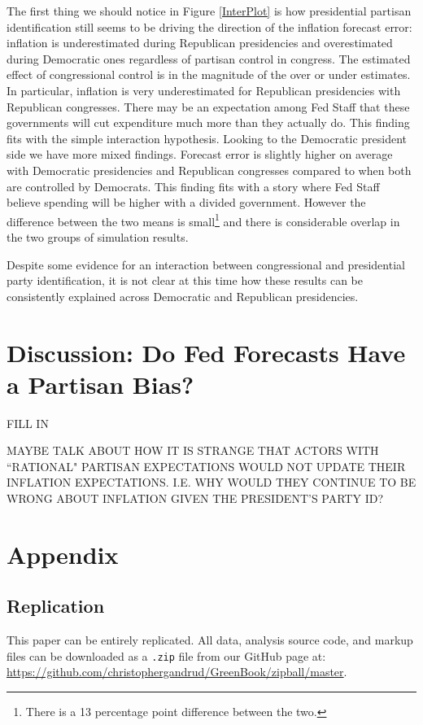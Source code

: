 \documentclass[a4paper]{article}\usepackage{graphicx, color}
\begin{document}
The first thing we should notice in Figure \ref{InterPlot} is how presidential partisan identification still seems to be driving the direction of the inflation forecast error: inflation is underestimated during Republican presidencies and overestimated during Democratic ones regardless of partisan control in congress. The estimated effect of congressional control is in the magnitude of the over or under estimates. In particular, inflation is very underestimated for Republican presidencies with Republican congresses. There may be an expectation among Fed Staff that these governments will cut expenditure much more than they actually do. This finding fits with the simple interaction hypothesis. Looking to the Democratic president side we have more mixed findings. Forecast error is slightly higher on average with Democratic presidencies and Republican congresses compared to when both are controlled by Democrats. This finding fits with a story where Fed Staff believe spending will be higher with a divided government. However the difference between the two means is small\footnote{There is a 13 percentage point difference between the two.} and there is considerable overlap in the two groups of simulation results.

Despite some evidence for an interaction between congressional and presidential party identification, it is not clear at this time how these results can be consistently explained across Democratic and Republican presidencies. 

\section*{Discussion: Do Fed Forecasts Have a Partisan Bias?}

FILL IN

MAYBE TALK ABOUT HOW IT IS STRANGE THAT ACTORS WITH ``RATIONAL" PARTISAN EXPECTATIONS WOULD NOT UPDATE THEIR INFLATION EXPECTATIONS. I.E. WHY WOULD THEY CONTINUE TO BE WRONG ABOUT INFLATION GIVEN THE PRESIDENT'S PARTY ID?

\clearpage
\section*{Appendix}

\subsection*{Replication}

This paper can be entirely replicated. All data, analysis source code, and markup files can be downloaded as a {\tt{.zip}} file from our GitHub page at: {\url{https://github.com/christophergandrud/GreenBook/zipball/master}}. 
\end{document}
